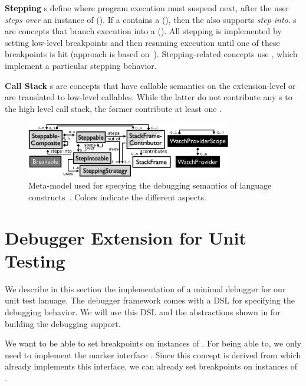 \noindent \textbf{Stepping} s  
define where program execution must suspend
next, after the user \emph{steps over} 
an instance of  (\eg {}). If a
 contains a  (\eg {}), 
then the  also supports \emph{step into}. s are
concepts that branch execution into a  (\eg {}).
All stepping is implemented by setting low-level breakpoints and then resuming
execution until one of these breakpoints is hit (approach is based
on~\cite{Wu06grammar}).
Stepping-related concepts use ,
which implement a particular stepping behavior.

\noindent \textbf{Call Stack} s are
concepts that have callable semantics on the extension-level or are
translated to low-level callables. While the latter do not
contribute any s to the high level call stack, the former
contribute at least one .

\begin{figure}[h]
  \vspace{-2mm}
  \centering
    \includegraphics[width=9cm]{./figures/debugger-concepts.png} 
    \vspace{-2mm}
    \caption{Meta-model used for specying the debugging semantics of language
    constructs~\cite{DBLP:conf/adaEurope/AdaEuropeDeb}. Colors indicate the
    different aspects.} 
  \label{specabs}
  \vspace{-2mm}
\end{figure}

\section{Debugger Extension for Unit Testing}

We describe in this section the implementation of a minimal debugger
for our unit test lanuage. The debugger framework comes with a \ac{DSL}
for specifying the debugging behavior. We will use this \ac{DSL} and the
abstractions shown in  for building the debugging support.

  We want to be able to set breakpoints on instances of
. For being able to, we only need to implement the marker
interface . Since this concept
is derived from  which already implements this
interface, we can already set breakpoints on instances of .

